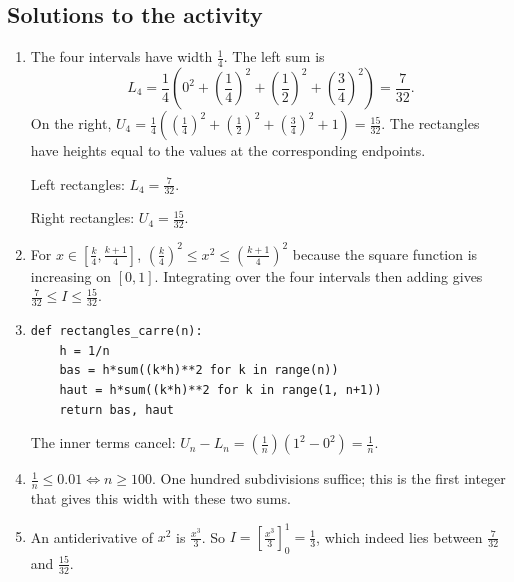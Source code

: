 \subsection{Solutions to the activity}\begin{enumerate}
\item The four intervals have width $\frac{1}{4}$. The left sum is
\[L_4=\frac{1}{4}(0^2+(\frac{1}{4})^2+(\frac{1}{2})^2+(\frac{3}{4})^2)=\frac{7}{32}.\]
On the right, $U_4=\frac{1}{4}((\frac{1}{4})^2+(\frac{1}{2})^2+(\frac{3}{4})^2+1)=\frac{15}{32}$. The rectangles have heights equal to the values at the corresponding endpoints.
\begin{center}\begin{minipage}{.47\linewidth}\centering
{}\par\small Left rectangles: $L_4=\frac{7}{32}$.\end{minipage}\hfill\begin{minipage}{.47\linewidth}\centering
{}\par\small Right rectangles: $U_4=\frac{15}{32}$.\end{minipage}\end{center}
\item For $x\in[\frac{k}{4},\frac{k+1}{4}]$, $(\frac{k}{4})^2\le x^2\le(\frac{k+1}{4})^2$ because the square function is increasing on $[0,1]$. Integrating over the four intervals then adding gives $\frac{7}{32}\le I\le\frac{15}{32}$.
\item
\begin{lstlisting}
def rectangles_carre(n):
    h = 1/n
    bas = h*sum((k*h)**2 for k in range(n))
    haut = h*sum((k*h)**2 for k in range(1, n+1))
    return bas, haut
\end{lstlisting}
The inner terms cancel: $U_n-L_n=(\frac{1}{n})(1^2-0^2)=\frac{1}{n}$.
\item $\frac{1}{n}\le0.01\Longleftrightarrow n\ge100$. One hundred subdivisions suffice; this is the first integer that gives this width with these two sums.
\item An antiderivative of $x^2$ is $\frac{x^3}{3}$. So $I=[\frac{x^3}{3}]_0^1=\frac{1}{3}$, which indeed lies between $\frac{7}{32}$ and $\frac{15}{32}$.
\end{enumerate}

